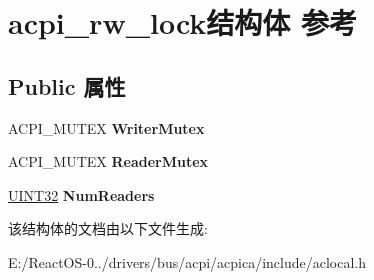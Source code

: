\hypertarget{structacpi__rw__lock}{}\section{acpi\+\_\+rw\+\_\+lock结构体 参考}
\label{structacpi__rw__lock}
\subsection*{Public 属性}
\begin{DoxyCompactItemize}
\item 
\mbox{\label{structacpi__rw__lock_a6a8dbc8491eb6cfcaeeba1c18311dd0f}} 
A\+C\+P\+I\+\_\+\+M\+U\+T\+EX {\bfseries Writer\+Mutex}
\item 
\mbox{\label{structacpi__rw__lock_a57b770d8f1aeba554c75b6edba095177}} 
A\+C\+P\+I\+\_\+\+M\+U\+T\+EX {\bfseries Reader\+Mutex}
\item 
\mbox{\label{structacpi__rw__lock_a81c69ee512706e45df3b22d279119380}} 
\hyperlink{_processor_bind_8h_ae1e6edbbc26d6fbc71a90190d0266018}{U\+I\+N\+T32} {\bfseries Num\+Readers}
\end{DoxyCompactItemize}


该结构体的文档由以下文件生成\+:\begin{DoxyCompactItemize}
\item 
E\+:/\+React\+O\+S-\/0../drivers/bus/acpi/acpica/include/aclocal.\+h\end{DoxyCompactItemize}
